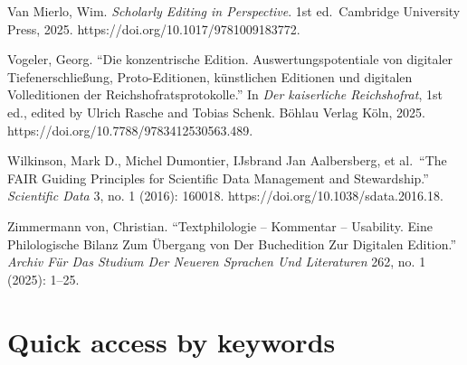 \documentclass[
  letterpaper,
  DIV=11,
  numbers=noendperiod]{scrreprt}
\begin{document}
Van Mierlo, Wim. \emph{Scholarly Editing in Perspective}. 1st
ed.~Cambridge University Press, 2025.
https://doi.org/10.1017/9781009183772.

Vogeler, Georg. ``Die konzentrische Edition. Auswertungspotentiale von
digitaler Tiefenerschließung, Proto-Editionen, künstlichen Editionen und
digitalen Volleditionen der Reichshofratsprotokolle.'' In \emph{Der
kaiserliche Reichshofrat}, 1st ed., edited by Ulrich Rasche and Tobias
Schenk. Böhlau Verlag Köln, 2025.
https://doi.org/10.7788/9783412530563.489.

Wilkinson, Mark D., Michel Dumontier, IJsbrand Jan Aalbersberg, et
al.~``The FAIR Guiding Principles for Scientific Data Management and
Stewardship.'' \emph{Scientific Data} 3, no. 1 (2016): 160018.
https://doi.org/10.1038/sdata.2016.18.

Zimmermann von, Christian. ``Textphilologie -- Kommentar -- Usability.
Eine Philologische Bilanz Zum Übergang von Der Buchedition Zur Digitalen
Edition.'' \emph{Archiv Für Das Studium Der Neueren Sprachen Und
Literaturen} 262, no. 1 (2025): 1--25.

\section*{}\label{section}

\markright{}

\section{Quick access by keywords}\label{quick-access-by-keywords}
\end{document}
